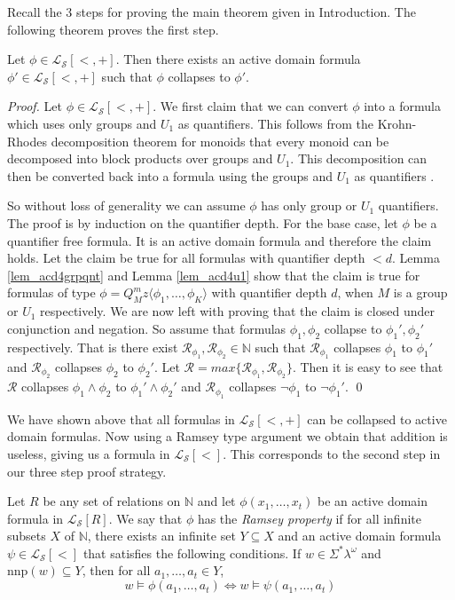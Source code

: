 \documentclass[envcountsame]{llncs}
\newcommand{\Nat}{\mathbb{N}}
\newcommand{\mon}[2]{Q_{#1}^{#2}}
\newcommand{\nnp}{\mathrm{nnp}}
\begin{document}
Recall the $3$ steps for proving the main theorem given in Introduction. The following theorem proves the first step.

\begin{theorem}
\label{thm_acd4ls}
 Let $\phi \in \mathcal{L_S}[<,+]$. Then there exists an active domain formula $\phi' \in \mathcal{L_S}[<,+]$ such that $\phi$ collapses to $\phi'$.
\end{theorem}
\begin{proof}
Let $\phi \in \mathcal{L_S}[<,+]$. We first claim that we can convert $\phi$ into a formula which uses only groups and $U_1$ as quantifiers. 
This follows from the Krohn-Rhodes decomposition theorem for monoids that every monoid can be decomposed into block products over groups and $U_1$. This decomposition can then be converted back into a formula using the groups and $U_1$ as quantifiers \cite{str_cirBook}. 

So without loss of generality we can assume $\phi$ has only group or $U_1$ quantifiers.
The proof is by induction on the quantifier depth. For the base case, let $\phi$ be a quantifier free formula. 
It is an active domain formula and therefore the claim holds. Let the claim be true for all formulas with quantifier depth $< d$. 
Lemma \ref{lem_acd4grpqnt} and Lemma \ref{lem_acd4u1} show that the claim is true for formulas of type $\phi = \mon{M}{m} z \langle \phi_1,\dots,\phi_K \rangle$ with 
quantifier depth $d$, when $M$ is a group or $U_1$ respectively. We are now left with proving that the claim is closed under conjunction and negation. So assume that 
formulas $\phi_1,\phi_2$ collapse to $\phi_1', \phi_2'$ respectively. That is there exist $\mathcal{R}_{\phi_1},\mathcal{R}_{\phi_2}\in \Nat$ such that $\mathcal{R}_{\phi_1}$ collapses
$\phi_1$ to $\phi_1'$ and $\mathcal{R}_{\phi_2}$ collapses $\phi_2$ to $\phi_2'$. Let $\mathcal{R}=max \{\mathcal{R}_{\phi_1},\mathcal{R}_{\phi_2}\}$. 
Then it is easy to see that $\mathcal{R}$ collapses $\phi_1 \wedge \phi_2$ to $\phi_1' \wedge \phi_2'$ and $\mathcal{R}_{\phi_1}$ collapses $\neg \phi_1$ to $\neg \phi_1'$.
\qed \end{proof}

We have shown above that all formulas in $\mathcal{L_S}[<,+]$ can be collapsed to active domain formulas. Now using a Ramsey type argument we obtain that addition is useless, giving us a formula in $\mathcal{L_S}[<]$. This corresponds to the second step in our three step proof strategy.

Let $R$ be any set of relations on $\Nat$ and let $\phi(x_1,\dots,x_t)$ be an active domain formula in $\mathcal{L_S}[R]$. We say that
$\phi$ has the \emph{Ramsey property} if for all infinite subsets $X$ of $\Nat$, there exists an infinite set $Y \subseteq X$ and an active
domain formula $\psi \in\mathcal{L_S}[<]$ that satisfies the following conditions. 
If $w \in \Sigma^*\lambda^{\omega}$ and $\nnp(w) \subseteq Y$, then for all $a_1,\dots,a_t \in Y$,
$$w \vDash \phi(a_1,\dots,a_t) \Leftrightarrow w \vDash \psi(a_1,\dots,a_t)$$ 
\end{document}
